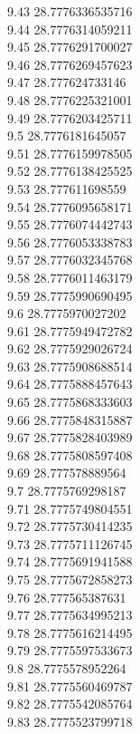 {9.43	28.7776336535716\\
9.44	28.7776314059211\\
9.45	28.7776291700027\\
9.46	28.7776269457623\\
9.47	28.777624733146\\
9.48	28.7776225321001\\
9.49	28.7776203425711\\
9.5	28.7776181645057\\
9.51	28.7776159978505\\
9.52	28.7776138425525\\
9.53	28.777611698559\\
9.54	28.7776095658171\\
9.55	28.7776074442743\\
9.56	28.7776053338783\\
9.57	28.7776032345768\\
9.58	28.7776011463179\\
9.59	28.7775990690495\\
9.6	28.7775970027202\\
9.61	28.7775949472782\\
9.62	28.7775929026724\\
9.63	28.7775908688514\\
9.64	28.7775888457643\\
9.65	28.7775868333603\\
9.66	28.7775848315887\\
9.67	28.7775828403989\\
9.68	28.7775808597408\\
9.69	28.777578889564\\
9.7	28.7775769298187\\
9.71	28.7775749804551\\
9.72	28.7775730414235\\
9.73	28.7775711126745\\
9.74	28.7775691941588\\
9.75	28.7775672858273\\
9.76	28.777565387631\\
9.77	28.7775634995213\\
9.78	28.7775616214495\\
9.79	28.7775597533673\\
9.8	28.7775578952264\\
9.81	28.7775560469787\\
9.82	28.7775542085764\\
9.83	28.7775523799718\\
}

